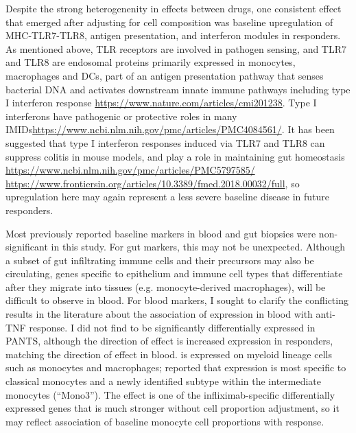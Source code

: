 \begin{outline}
Despite the strong heterogenenity in effects between drugs, one consistent effect that emerged after adjusting for cell composition was 
baseline upregulation of MHC-TLR7-TLR8, antigen presentation, and interferon modules in responders.
As mentioned above, \gls{TLR} receptors are involved in pathogen sensing, and TLR7 and TLR8 are endosomal proteins primarily expressed in monocytes, macrophages and \glspl{DC},
part of an antigen presentation pathway that senses bacterial DNA and activates downstream innate immune pathways including type I interferon response \url{https://www.nature.com/articles/cmi201238}.
Type I interferons have pathogenic or protective roles in many \glspl{IMID}\url{https://www.ncbi.nlm.nih.gov/pmc/articles/PMC4084561/}.
It has been suggested that type I interferon responses induced via TLR7 and TLR8 can suppress colitis in mouse models, and play a role in maintaining gut homeostasis
\url{https://www.ncbi.nlm.nih.gov/pmc/articles/PMC5797585/}
\url{https://www.frontiersin.org/articles/10.3389/fmed.2018.00032/full},
so upregulation here may again represent a less severe baseline disease in future responders.

Most previously reported baseline markers in blood and gut biopsies were non-significant in this study.
For gut markers, this may not be unexpected.
Although a subset of gut infiltrating immune cells and their precursors may also be circulating,
genes specific to epithelium and immune cell types that differentiate after they migrate into tissues (e.g. monocyte-derived macrophages),
will be difficult to observe in blood.
For blood markers, I sought to clarify the conflicting results in the literature about the association of  expression in blood with anti-\gls{TNF} response\autocite{gaujoux2019CellcentredMetaanalysisReveals,verstockt2019LowTREM1Expression}.
I did not find  to be significantly differentially expressed in \gls{PANTS},
although the direction of effect is increased expression in responders,
matching the \textcite{gaujoux2019CellcentredMetaanalysisReveals} direction of effect in blood.
 is expressed on myeloid lineage cells such as monocytes and macrophages;
\textcite{villani2017SinglecellRNAseqReveals} reported that  expression is most specific to 
classical monocytes and a newly identified subtype within the intermediate monocytes (\enquote{Mono3}).
The  effect is one of the infliximab-specific differentially expressed genes that is much stronger without cell proportion adjustment,
so it may reflect association of baseline monocyte cell proportions with response.


\end{outline}
